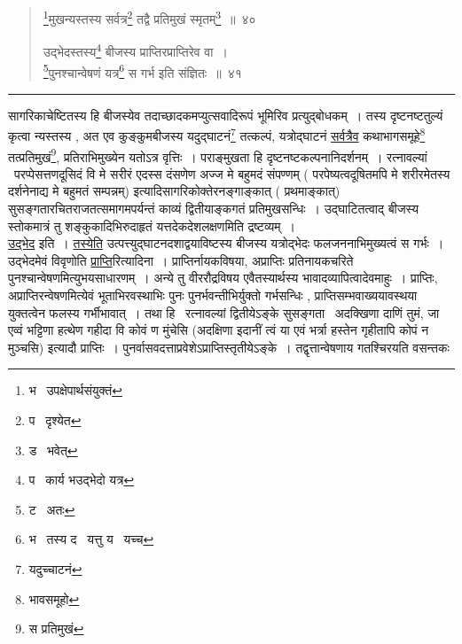 \documentclass[11pt, openany]{book}
\begin{document}
\begin{quote}
{\na \renewcommand{\thefootnote}{1}\footnote{भ \textendash\ उपक्षेपार्थसंयुक्तं}मुखन्यस्तस्य सर्वत्र\renewcommand{\thefootnote}{2}\footnote{प \textendash\ दृश्येत} तद्वै प्रतिमुखं स्मृतम्\renewcommand{\thefootnote}{3}\footnote{ड \textendash\ भवेत्}~॥~४०

उद्भेदस्तस्य\renewcommand{\thefootnote}{4}\footnote{प \textendash\ कार्य भउद्भेदो यत्र} बीजस्य प्राप्तिरप्राप्तिरेव वा~।\\
\renewcommand{\thefootnote}{5}\footnote{ट \textendash\ अतः}पुनश्चान्वेषणं यत्र\renewcommand{\thefootnote}{6}\footnote{भ \textendash\ तस्य द \textendash\ यत्तु य \textendash\ यच्च} स गर्भ इति संज्ञितः~॥~४१}
\end{quote}

\hrule

\vspace{2mm}
\noindent
सागरिकाचेष्टितस्य हि बीजस्येव तदाच्छादकमप्युत्सवादिरूपं भूमिरिव प्रत्युद्बोधकम्~। तस्य दृष्टनष्टतुल्यं कृत्वा न्यस्तस्य , अत एव कुङ्कुमबीजस्य यदुद्घाटनं\renewcommand{\thefootnote}{1}\footnote{यदुच्चाटनं} तत्कल्पं, यत्रोद्घाटनं \underline{सर्वत्रैव} कथाभागसमूहे\renewcommand{\thefootnote}{2}\footnote{भावसमूहो} तत्प्रतिमुखं\renewcommand{\thefootnote}{3}\footnote{स प्रतिमुखं}, प्रतिराभिमुख्येन यतोऽत्र वृत्तिः~। पराङ्मुखता हि दृष्टनष्टकल्पनानिदर्शनम्~। रत्नावल्यां \textendash\ परप्पेसत्तणदूसिदं वि मे सरीरं एदस्स दंसणेण अज्ज मे बहुमदं संपण्णम् ( परपेष्यत्वदूषितमपि मे शरीरमेतस्य दर्शनेनाद्य मे बहुमतं सम्पन्नम्) इत्यादिसागरिकोक्तेरनङ्गाङ्कात् ( प्रथमाङ्कात्) सुसङ्गतारचितराजतत्समागमपर्यन्तं काव्यं द्वितीयाङ्कगतं प्रतिमुखसन्धिः~। उद्घाटितत्वाद् बीजस्य स्तोकमात्रं तु शङ्कुकादिभिरुदाहृतं यत्तदेकदेशलक्षणमिति द्रष्टव्यम्~।\\

\underline{उद्भेद} इति~। \underline{तस्येति} उत्पत्त्युद्घाटनदशाद्वयाविष्टस्य बीजस्य यत्रोद्भेदः फलजननाभिमुख्यत्वं स गर्भः~। उद्भेदमेवं विवृणोति \underline{प्राप्ति}रित्यादिना~। प्राप्तिर्नायकविषया, अप्राप्तिः प्रतिनायकचरिते पुनश्चान्वेषणमित्युभयसाधारणम्~। अन्ये तु वीररौद्रविषय एवैतस्यार्थस्य भावादव्यापित्वादेवमाहुः~। प्राप्तिः, अप्राप्तिरन्वेषणमित्येवं भूताभिरवस्थाभिः पुनः पुनर्भवन्तीभिर्युक्तो गर्भसन्धिः , प्राप्तिसम्भवाख्ययावस्थया युक्तत्वेन फलस्य गर्भीभावात्~। तथा हि \textendash\ रत्नावल्यां द्वितीयेऽङ्के सुसङ्गता \textendash\ अदक्खिणा दाणिं तुमं, जा एव्वं भट्टिणा हत्थेण गहीदा वि कोवं ण मुंचेसि (अदक्षिणा इदानीं त्वं या एवं भर्त्रा हस्तेन गृहीतापि कोपं न मुञ्चसि) इत्यादौ प्राप्तिः~। पुनर्वासवदत्ताप्रवेशेऽप्राप्तिस्तृतीयेऽङ्के~। {\qt तद्वृत्तान्वेषणाय गतश्चिरयति वसन्तकः}
\end{document}
